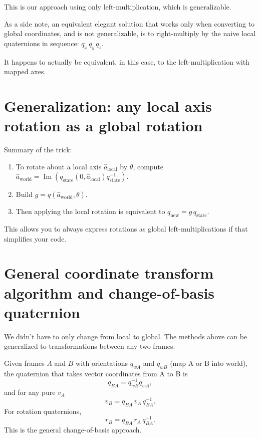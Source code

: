\documentclass[11pt]{article}
\begin{document}
This is our approach using only left-multiplication, which is generalizable.

As a side note, an equivalent elegant solution that works only when converting to global coordinates, and is not generalizable, is to right-multiply by the naive local quaternions in sequence: \(q_x \, q_y \, q_z\).

It happens to actually be equivalent, in this case, to the left-multiplication with mapped axes.

\section{Generalization: any local axis rotation as a global rotation}
Summary of the trick:
\begin{enumerate}
  \item To rotate about a local axis \(\hat{a}_\text{local}\) by \(\theta\),
        compute \(\hat{a}_\text{world} = \operatorname{Im}(q_\text{state}(0,\hat{a}_\text{local})q_\text{state}^{-1})\).
  \item Build \(g = q(\hat{a}_\text{world},\theta)\).
  \item Then applying the local rotation is equivalent to \(q_\text{new}=g\, q_\text{state}\).
\end{enumerate}
This allows you to always express rotations as global left-multiplications if that
simplifies your code.

\section{General coordinate transform algorithm and change-of-basis quaternion}
We didn't have to only change from local to global. The methods above can be generalized to transformations between any two frames.

Given frames \(A\) and \(B\) with orientations \(q_{wA}\) and \(q_{wB}\) (map A or B into world), the quaternion that takes vector coordinates from A to B is
\[
q_{BA} = q_{wB}^{-1} q_{wA},
\]
and for any pure \(v_A\)
\[
v_B = q_{BA}\, v_A\, q_{BA}^{-1}.
\]
For rotation quaternions,
\[
r_B = q_{BA}\, r_A\, q_{BA}^{-1}.
\]
This is the general change-of-basis approach.
\end{document}
